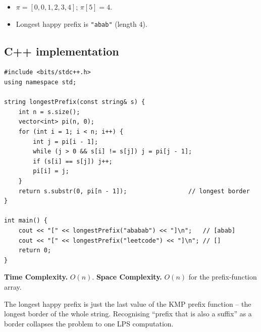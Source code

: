 \begin{itemize}
  \item $\pi=[0,0,1,2,3,4]$; $\pi[5]=4$.
  \item Longest happy prefix is \texttt{"abab"} (length $4$).
\end{itemize}

\subsection*{C++ implementation}

\begin{lstlisting}
#include <bits/stdc++.h>
using namespace std;

string longestPrefix(const string& s) {
    int n = s.size();
    vector<int> pi(n, 0);
    for (int i = 1; i < n; i++) {
        int j = pi[i - 1];
        while (j > 0 && s[i] != s[j]) j = pi[j - 1];
        if (s[i] == s[j]) j++;
        pi[i] = j;
    }
    return s.substr(0, pi[n - 1]);                 // longest border
}

int main() {
    cout << "[" << longestPrefix("ababab") << "]\n";   // [abab]
    cout << "[" << longestPrefix("leetcode") << "]\n"; // []
    return 0;
}
\end{lstlisting}

\begin{complexitybox}
\textbf{Time Complexity.} $O(n)$. \textbf{Space Complexity.} $O(n)$ for the
prefix-function array.
\end{complexitybox}

\begin{takeawaybox}
The longest happy prefix is just the last value of the KMP prefix function
-- the longest border of the whole string. Recognising ``prefix that is also
a suffix'' as a border collapses the problem to one LPS computation.
\end{takeawaybox}
